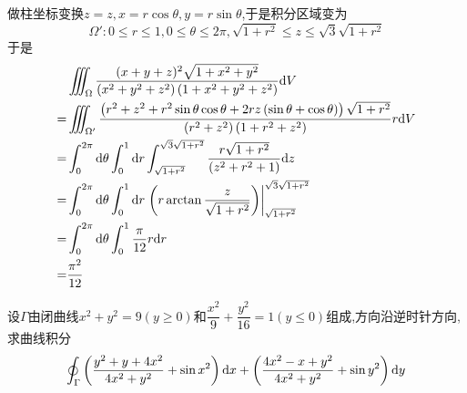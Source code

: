 \documentclass{ctexart}
\begin{document}
\begin{solution}
    做柱坐标变换$z=z,x=r\cos\theta,y=r\sin\theta$,于是积分区域变为
    \[\Omega':0\leqslant r\leqslant 1,0\leqslant\theta\leqslant2\pi,\sqrt{1+r^2}\leqslant z\leqslant \sqrt3\sqrt{1+r^2}\]
    于是
    \[\begin{aligned}
        &\iiint_{\Omega}\dfrac{(x+y+z)^2\sqrt{1+x^2+y^2}}{\left(x^2+y^2+z^2\right)\left(1+x^2+y^2+z^2\right)}\mathrm{d} V \\
        =&\iiint_{\Omega'}\dfrac{\left(r^2+z^2+r^2\sin\theta\cos\theta+2rz\left(\sin\theta+\cos\theta\right)\right)\sqrt{1+r^2}}{\left(r^2+z^2\right)\left(1+r^2+z^2\right)}r\mathrm{d} V \\
        =&\int_0^{2\pi}\mathrm{d}\theta\int_0^1\mathrm{d} r\int_{\sqrt{1+r^2}}^{\sqrt3\sqrt{1+r^2}}\dfrac{r\sqrt{1+r^2}}{\left(z^2+r^2+1\right)}\mathrm{d} z \\
        =&\int_0^{2\pi}\mathrm{d}\theta\int_0^1\mathrm{d} r\left.\left(r\arctan\dfrac{z}{\sqrt{1+r^2}}\right)\right|_{\sqrt{1+r^2}}^{\sqrt3\sqrt{1+r^2}} \\
        =&\int_0^{2\pi}\mathrm{d}\theta\int_0^1\dfrac{\pi}{12}r\mathrm{d} r \\
        =&\dfrac{\pi^2}{12}
    \end{aligned}\]

\end{solution}
\begin{problem}[9.(10\songti{分})]
    设$\Gamma$由闭曲线$x^2+y^2=9(y\geqslant0)$和$\dfrac{x^2}{9}+\dfrac{y^2}{16}=1(y\leqslant0)$组成,方向沿逆时针方向,求曲线积分
    \[\oint_{\Gamma}\left(\dfrac{y^2+y+4x^2}{4x^2+y^2}+\sin x^2\right)\mathrm{d} x+\left(\dfrac{4x^2-x+y^2}{4x^2+y^2}+\sin y^2\right)\mathrm{d} y\]

\end{problem}
\end{document}
